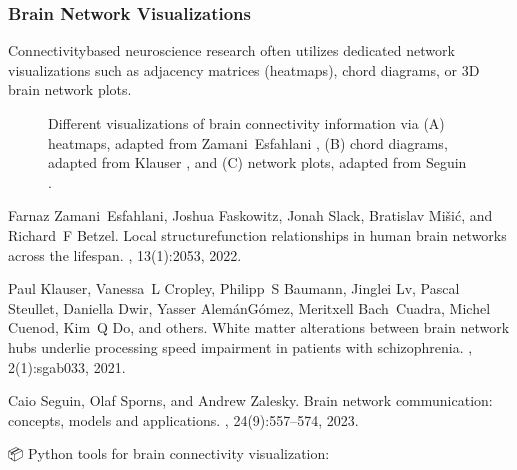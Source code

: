\documentclass[letterpaper,10pt,english]{jupyterBook}
\begin{document}
\subsubsection{Brain Network Visualizations}
\label{\detokenize{chapters/03/03b_visualization-tools:brain-network-visualizations}}
\sphinxAtStartPar
Connectivity\sphinxhyphen{}based neuroscience  research often utilizes dedicated network visualizations such as adjacency matrices (heatmaps), chord diagrams, or 3D brain network plots.

\begin{figure}[htbp]
\centering
\capstart

\noindent{}
\caption{Different visualizations of brain connectivity information via (A) heatmaps, adapted from Zamani Esfahlani \sphinxfootnotemark[6], (B) chord diagrams, adapted from Klauser \sphinxfootnotemark[7], and (C) network plots, adapted from Seguin \sphinxfootnotemark[8].}\label{\detokenize{chapters/03/03b_visualization-tools:network}}\end{figure}
%
\begin{footnotetext}[6]\sphinxAtStartFootnote
Farnaz Zamani Esfahlani, Joshua Faskowitz, Jonah Slack, Bratislav Mišić, and Richard F Betzel. Local structure\sphinxhyphen{}function relationships in human brain networks across the lifespan. , 13(1):2053, 2022.
%
\end{footnotetext}\ignorespaces %
\begin{footnotetext}[7]\sphinxAtStartFootnote
Paul Klauser, Vanessa L Cropley, Philipp S Baumann, Jinglei Lv, Pascal Steullet, Daniella Dwir, Yasser Alemán\sphinxhyphen{}Gómez, Meritxell Bach Cuadra, Michel Cuenod, Kim Q Do, and others. White matter alterations between brain network hubs underlie processing speed impairment in patients with schizophrenia. , 2(1):sgab033, 2021.
%
\end{footnotetext}\ignorespaces %
\begin{footnotetext}[8]\sphinxAtStartFootnote
Caio Seguin, Olaf Sporns, and Andrew Zalesky. Brain network communication: concepts, models and applications. , 24(9):557–574, 2023.
%
\end{footnotetext}\ignorespaces 
\sphinxAtStartPar
📦 Python tools for brain connectivity visualization:
\end{document}

